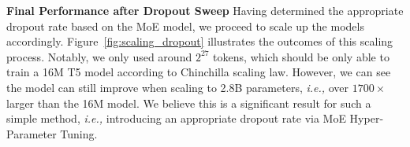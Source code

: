 \documentclass{article}
\newcommand{\ie}{\emph{i.e.,}\xspace}
\begin{document}

\textbf{Final Performance after Dropout Sweep} 
Having determined the appropriate dropout rate based on the MoE model, we proceed to scale up the models accordingly. Figure~\ref{fig:scaling_dropout} illustrates the outcomes of this scaling process. Notably, we only used around $2^{27}$ tokens, which should be only able to train a 16M T5 model according to Chinchilla scaling law. However, we can see the model can still improve when scaling to 2.8B parameters, \ie over $1700\times$ larger than the 16M model. We believe this is a significant result for such a simple method, \ie introducing an appropriate dropout rate via MoE Hyper-Parameter Tuning.





\end{document}
